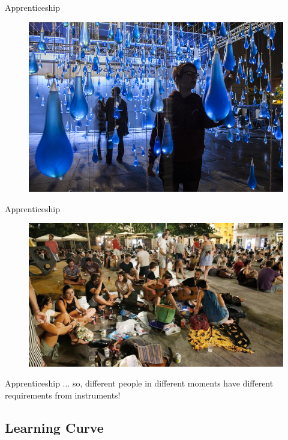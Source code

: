 \documentclass{beamer}
\begin{document}
\begin{frame}{Apprenticeship}
    \begin{figure}[h]
        \includegraphics[width=\textwidth]{installation.jpg}
    \end{figure}
\end{frame}

\begin{frame}{Apprenticeship}
    \begin{figure}[h]
        \includegraphics[width=\textwidth]{sol.jpg}
    \end{figure}
\end{frame}

\begin{frame}{Apprenticeship}
    ... so, different people in different moments have different requirements from instruments!
\end{frame}

\subsection{Learning Curve}
\end{document}
